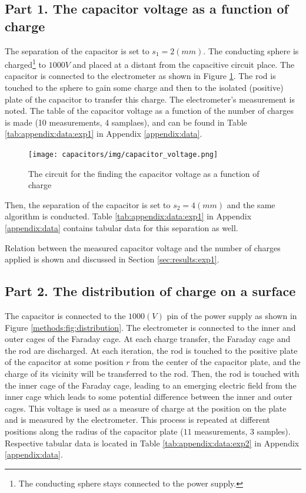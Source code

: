 \subsection{Part 1. The capacitor voltage as a function of charge} \label{sec:methods:exp1}

The separation of the capacitor is set to $s_{1} = 2 (mm)$. The conducting sphere is charged\footnote{The conducting sphere stays connected to the power supply.} to $1000V$ and placed at a distant from the capacitive circuit place. The capacitor is connected to the electrometer as shown in Figure \ref{methods:fig:capacitor_voltage}. The rod is touched to the sphere to gain some charge and then to the isolated (positive) plate of the capacitor to transfer this charge. The electrometer's measurement is noted. The table of the capacitor voltage as a function of the number of charges is made (10 measurements, 4 samplaes), and can be found in Table \ref{tab:appendix:data:exp1} in Appendix \ref{appendix:data}.  

\begin{figure}[H]
  \centering
  \texttt{[image: capacitors/img/capacitor\_voltage.png]}
  \caption{The circuit for the finding the capacitor voltage as a function of charge}
  \label{methods:fig:capacitor_voltage}
\end{figure}

Then, the separation of the capacitor is set to $s_{2} = 4 (mm)$ and the same algorithm is conducted. Table \ref{tab:appendix:data:exp1} in Appendix \ref{appendix:data} contains tabular data for this separation as well.

Relation between the measured capacitor voltage and the number of charges applied is shown and discussed in Section \ref{sec:results:exp1}.

\subsection{Part 2. The distribution of charge on a surface} \label{sec:methods:exp2}

The capacitor is connected to the $1000 (V)$ pin of the power supply as shown in Figure \ref{methods:fig:distribution}. The electrometer is connected to the inner and outer cages of the Faraday cage. At each charge transfer, the Faraday cage and the rod are discharged. At each iteration, the rod is touched to the positive plate of the capacitor at some position $r$ from the center of the capacitor plate, and the charge of its vicinity will be transferred to the rod. Then, the rod is touched with the inner cage of the Faraday cage, leading to an emerging electric field from the inner cage which leads to some potential difference between the inner and outer cages. This voltage is used as a measure of charge at the position on the plate and is measured by the electrometer. This process is repeated at different positions along the radius of the capacitor plate ($11$ measurements, $3$ samples). Respective tabular data is located in Table \ref{tab:appendix:data:exp2} in Appendix \ref{appendix:data}.

